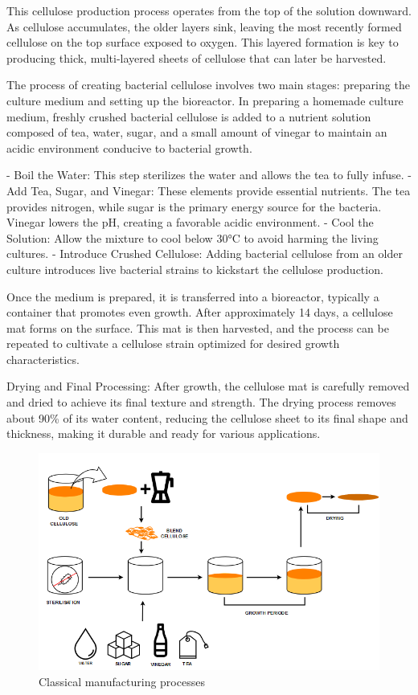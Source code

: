 This cellulose production process operates from the top of the solution downward. As cellulose accumulates, the older layers sink, leaving the most recently formed cellulose on the top surface exposed to oxygen. This layered formation is key to producing thick, multi-layered sheets of cellulose that can later be harvested.

The process of creating bacterial cellulose involves two main stages: preparing the culture medium and setting up the bioreactor. In preparing a homemade culture medium, freshly crushed bacterial cellulose is added to a nutrient solution composed of tea, water, sugar, and a small amount of vinegar to maintain an acidic environment conducive to bacterial growth.

\-- Boil the Water: This step sterilizes the water and allows the tea to fully infuse.
\-- Add Tea, Sugar, and Vinegar: These elements provide essential nutrients. The tea provides nitrogen, while sugar is the primary energy source for the bacteria. Vinegar lowers the pH, creating a favorable acidic environment.
\-- Cool the Solution: Allow the mixture to cool below 30°C to avoid harming the living cultures.
\-- Introduce Crushed Cellulose: Adding bacterial cellulose from an older culture introduces live bacterial strains to kickstart the cellulose production.

Once the medium is prepared, it is transferred into a bioreactor, typically a container that promotes even growth. After approximately 14 days, a cellulose mat forms on the surface. This mat is then harvested, and the process can be repeated to cultivate a cellulose strain optimized for desired growth characteristics.

Drying and Final Processing: After growth, the cellulose mat is carefully removed and dried to achieve its final texture and strength. The drying process removes about 90\% of its water content, reducing the cellulose sheet to its final shape and thickness, making it durable and ready for various applications.


\begin{figure}[h]
    \centering
    \includegraphics[width=1.2\textwidth]{images/SCOBY_diag.png}
    \caption{Classical manufacturing processes}
    \label{fig:manufacture}
\end{figure} 

